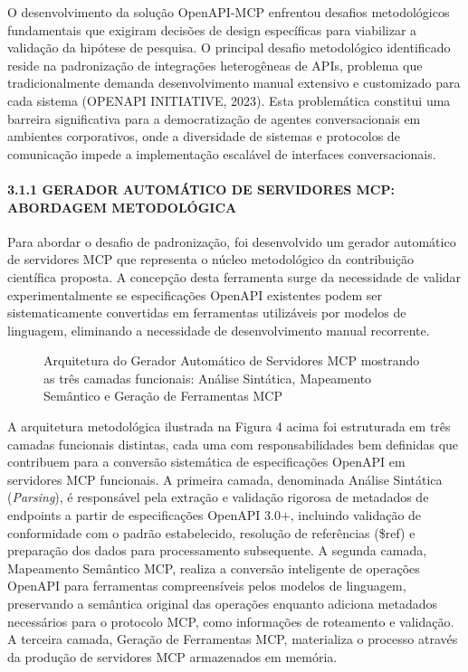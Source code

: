 \documentclass[
]{article}
\makeatletter
\newcommand*\pandocbounded[1]{%
  \sbox\pandoc@box{#1}%
  \Gscale@div\@tempa{\textheight}{\dimexpr\ht\pandoc@box+\dp\pandoc@box\relax}%
  \Gscale@div\@tempb{\linewidth}{\wd\pandoc@box}%
  \ifdim\@tempb\p@<\@tempa\p@\let\@tempa\@tempb\fi%
  \ifdim\@tempa\p@<\p@\scalebox{\@tempa}{\usebox\pandoc@box}%
  \else\usebox{\pandoc@box}%
  \fi%
}
\makeatother
\begin{document}
O desenvolvimento da solução OpenAPI-MCP enfrentou desafios
metodológicos fundamentais que exigiram decisões de design específicas
para viabilizar a validação da hipótese de pesquisa. O principal desafio
metodológico identificado reside na padronização de integrações
heterogêneas de APIs, problema que tradicionalmente demanda
desenvolvimento manual extensivo e customizado para cada sistema
(OPENAPI INITIATIVE, 2023). Esta problemática constitui uma barreira
significativa para a democratização de agentes conversacionais em
ambientes corporativos, onde a diversidade de sistemas e protocolos de
comunicação impede a implementação escalável de interfaces
conversacionais.

\paragraph{3.1.1 GERADOR AUTOMÁTICO DE SERVIDORES MCP: ABORDAGEM
METODOLÓGICA}\label{gerador-automuxe1tico-de-servidores-mcp-abordagem-metodoluxf3gica}

Para abordar o desafio de padronização, foi desenvolvido um gerador
automático de servidores MCP que representa o núcleo metodológico da
contribuição científica proposta. A concepção desta ferramenta surge da
necessidade de validar experimentalmente se especificações OpenAPI
existentes podem ser sistematicamente convertidas em ferramentas
utilizáveis por modelos de linguagem, eliminando a necessidade de
desenvolvimento manual recorrente.

\begin{figure}
\centering
\pandocbounded{\texttt{[image: images/development/mcp-generator-architecture.jpg]}}
\caption{Arquitetura do Gerador Automático de Servidores MCP mostrando
as três camadas funcionais: Análise Sintática, Mapeamento Semântico e
Geração de Ferramentas MCP}
\end{figure}

A arquitetura metodológica ilustrada na Figura 4 acima foi estruturada
em três camadas funcionais distintas, cada uma com responsabilidades bem
definidas que contribuem para a conversão sistemática de especificações
OpenAPI em servidores MCP funcionais. A primeira camada, denominada
Análise Sintática (\emph{Parsing}), é responsável pela extração e
validação rigorosa de metadados de endpoints a partir de especificações
OpenAPI 3.0+, incluindo validação de conformidade com o padrão
estabelecido, resolução de referências (\$ref) e preparação dos dados
para processamento subsequente. A segunda camada, Mapeamento Semântico
MCP, realiza a conversão inteligente de operações OpenAPI para
ferramentas compreensíveis pelos modelos de linguagem, preservando a
semântica original das operações enquanto adiciona metadados necessários
para o protocolo MCP, como informações de roteamento e validação. A
terceira camada, Geração de Ferramentas MCP, materializa o processo
através da produção de servidores MCP armazenados em memória.
\end{document}
